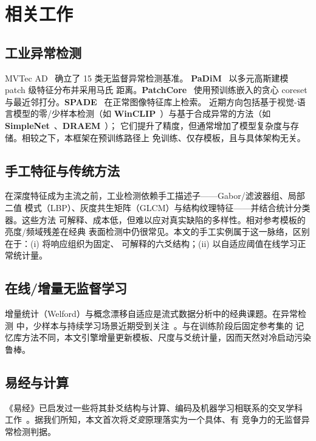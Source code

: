 \documentclass[journal,10pt]{IEEEtran}
\begin{document}
\section{相关工作}
\subsection{工业异常检测}
MVTec AD~\cite{bergmann2019mvtec} 确立了 15 类无监督异常检测基准。
\textbf{PaDiM}~\cite{defard2021padim} 以多元高斯建模 patch 级特征分布并采用马氏
距离。\textbf{PatchCore}~\cite{roth2022patchcore} 使用预训练嵌入的贪心 coreset
与最近邻打分。\textbf{SPADE}~\cite{cohen2021spade} 在正常图像特征库上检索。
近期方向包括基于视觉-语言模型的零/少样本检测（如
\textbf{WinCLIP}~\cite{jeong2023winclip}）与基于合成异常的方法（如
\textbf{SimpleNet}~\cite{liu2023simplenet}、\textbf{DRAEM}~\cite{zavrtanik2021draem}）；
它们提升了精度，但通常增加了模型复杂度与存储。相较之下，本框架在预训练路径上
免训练、仅存模板，且与具体架构无关。

\subsection{手工特征与传统方法}
在深度特征成为主流之前，工业检测依赖手工描述子——Gabor/滤波器组、局部二值
模式（LBP）、灰度共生矩阵（GLCM）与结构纹理特征——并结合统计分类器。这些方法
可解释、成本低，但难以应对真实缺陷的多样性。相对参考模板的亮度/频域残差在经典
表面检测中仍很常见。本文的手工实例属于这一脉络，区别在于：(i) 将响应组织为固定、
可解释的六爻结构；(ii) 以自适应阈值在线学习正常统计量。

\subsection{在线/增量无监督学习}
增量统计（Welford）与概念漂移自适应是流式数据分析中的经典课题。在异常检测
中，少样本与持续学习场景近期受到关注~\cite{jeong2023winclip}。与在训练阶段后固定参考集的
记忆库方法不同，本文引擎增量更新模板、尺度与爻统计量，因而天然对冷启动污染
鲁棒。

\subsection{易经与计算}
《易经》已启发过一些将其卦爻结构与计算、编码及机器学习相联系的交叉学科
工作~\cite{zhang2020yijing}。据我们所知，本文首次将\emph{爻变}原理落实为一个具体、有
竞争力的无监督异常检测判据。

\end{document}
